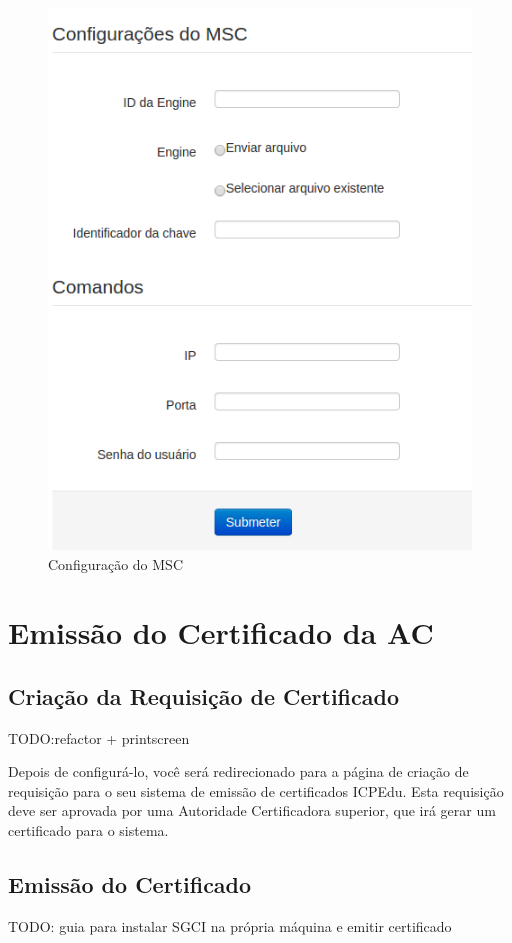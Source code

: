     \begin{figure}[h]
     \centering
     \includegraphics[scale=0.5]{images/confighsm.png}
     \caption{Configuração do MSC}
     \label{fig:confighsm}
\end{figure}


\section{Emissão do Certificado da AC}
\subsection{Criação da Requisição de Certificado}
TODO:refactor + printscreen

    Depois de configurá-lo, você será redirecionado para a página de criação de requisição para o seu sistema de emissão de certificados ICPEdu. Esta requisição deve ser aprovada por uma Autoridade Certificadora superior, que irá gerar um certificado para o sistema. 


\subsection{Emissão do Certificado}
TODO: guia para instalar SGCI na própria máquina e emitir certificado
    
